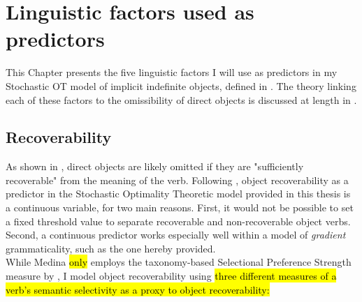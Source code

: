 \setchapterpreamble[u]{\margintoc}
\chapter{Linguistic factors used as predictors}

This Chapter presents the five linguistic factors I will use as predictors in my Stochastic OT model of implicit indefinite objects, defined in . The theory linking each of these factors to the omissibility of direct objects is discussed at length in .


\section{Recoverability} 



As shown in , direct objects are likely omitted if they are "sufficiently recoverable" \parencite{Glass2013} from the meaning of the verb. Following \textcite{Medina2007}, object recoverability as a predictor in the Stochastic Optimality Theoretic model provided in this thesis is a continuous variable, for two main reasons. First, it would not be possible to set a fixed threshold value to separate recoverable and non-recoverable object verbs. Second, a continuous predictor works especially well within a model of \textit{gradient} grammaticality, such as the one hereby provided.\\
While Medina \hl{only} employs the taxonomy-based Selectional Preference Strength measure by \textcite{Resnik1993, Resnik1996}, I model object recoverability using \hl{three different measures of a verb's semantic selectivity as a proxy to object recoverability:}

